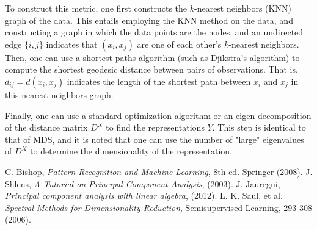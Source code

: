 \documentclass[12pt,letterpaper]{article}
\begin{document}
To construct this metric, one first constructs the $k$-nearest neighbors (KNN) graph of the data. This entails employing the KNN method on the data, and constructing a graph in which the data points are the nodes, and an undirected edge $\{i, j\}$ indicates that $(x_i , x_j)$ are one of each other’s $k$-nearest neighbors. Then, one can use a shortest-paths algorithm (such as Djikstra’s algorithm) to compute the shortest geodesic distance between pairs of observations. That is, $d_{ij} = d(x_i , x_j )$ indicates the length of the shortest path between $x_i$ and $x_j$ in this nearest neighbors graph.

Finally, one can use a standard optimization algorithm or an eigen-decomposition of the distance matrix $D^X$ to find the representations $Y$. This step is identical to that of MDS, and it is noted that one can use the number of "large" eigenvalues of $D^X$ to determine the dimensionality of the representation.


\begin{thebibliography}{99}
 C. Bishop, \textit{Pattern Recognition and Machine Learning}, 8th ed. Springer (2008).
 J. Shlens,  \textit{A Tutorial on Principal Component Analysis}, (2003).
 J. Jauregui, \textit{Principal component analysis with linear algebra}, (2012).
 L. K. Saul, et al. \textit{Spectral Methods for Dimensionality Reduction}, Semisupervised Learning, 293-308 (2006).
\end{thebibliography}
\end{document}
